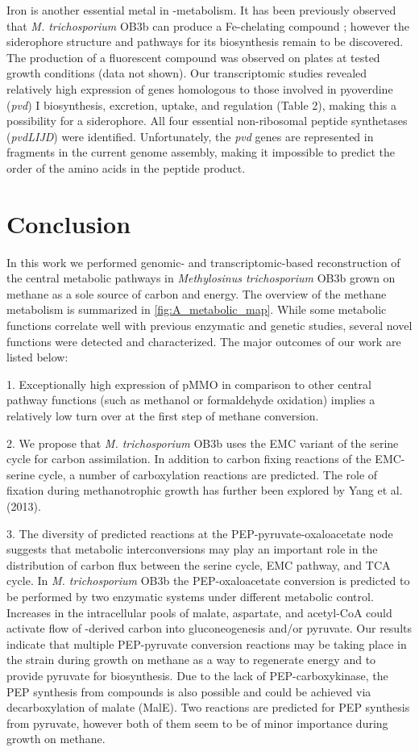 Iron is another essential metal in -metabolism.
It has been previously observed that \textit{M. trichosporium} OB3b can produce a Fe-chelating compound \cite{yoon2010}; however the siderophore structure and pathways for its biosynthesis remain to be discovered.
The production of a fluorescent compound was observed on plates at tested growth conditions (data not shown).
Our transcriptomic studies revealed relatively high expression of genes homologous to those involved in pyoverdine (\textit{pvd}) I biosynthesis, excretion, uptake, and regulation (Table 2), making this a possibility for a siderophore.
All four essential non-ribosomal peptide synthetases (\textit{pvdLIJD}) were identified.
Unfortunately, the \textit{pvd} genes are represented in fragments in the current genome assembly, making it impossible to predict the order of the amino acids in the peptide product.

\section{Conclusion}

In this work we performed genomic- and transcriptomic-based reconstruction of the central metabolic pathways in \textit{Methylosinus trichosporium} OB3b grown on methane as a sole source of carbon and energy.
The overview of the methane metabolism is summarized in \ref{fig:A_metabolic_map}.
While some metabolic functions correlate well with previous enzymatic and genetic studies, several novel functions were detected and characterized.
The major outcomes of our work are listed below:

1. Exceptionally high expression of pMMO in comparison to other central pathway functions (such as methanol or formaldehyde oxidation) implies a relatively low turn over at the first step of methane conversion.

2. We propose that \textit{M. trichosporium} OB3b uses the EMC variant of the serine cycle for carbon assimilation.
In addition to carbon fixing reactions of the EMC-serine cycle, a number of carboxylation reactions are predicted.
The role of  fixation during methanotrophic growth has further been explored by Yang et al. (2013).

3. The diversity of predicted reactions at the PEP-pyruvate-oxaloacetate node suggests that metabolic interconversions may play an important role in the distribution of carbon flux between the serine cycle, EMC pathway, and TCA cycle.
In \textit{M. trichosporium} OB3b the PEP-oxaloacetate conversion is predicted to be performed by two enzymatic systems under different metabolic control.
Increases in the intracellular pools of malate, aspartate, and acetyl-CoA could activate flow of -derived carbon into gluconeogenesis and/or pyruvate.
Our results indicate that multiple PEP-pyruvate conversion reactions may be taking place in the strain during growth on methane as a way to regenerate energy and to provide pyruvate for biosynthesis.
Due to the lack of PEP-carboxykinase, the PEP synthesis from  compounds is also possible and could be achieved via decarboxylation of malate (MalE).
Two reactions are predicted for PEP synthesis from pyruvate, however both of them seem to be of minor importance during growth on methane.

